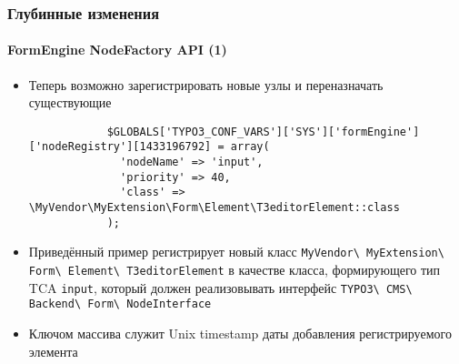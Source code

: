 \begin{frame}[fragile]
	\frametitle{Глубинные изменения}
	\framesubtitle{FormEngine NodeFactory API (1)}

	\lstset{basicstyle=\tiny\ttfamily}

	\begin{itemize}

		\item Теперь возможно зарегистрировать новые узлы и переназначать существующие

		\begin{lstlisting}
			$GLOBALS['TYPO3_CONF_VARS']['SYS']['formEngine']['nodeRegistry'][1433196792] = array(
			  'nodeName' => 'input',
			  'priority' => 40,
			  'class' => \MyVendor\MyExtension\Form\Element\T3editorElement::class
			);
		\end{lstlisting}

		\item Приведённый пример регистрирует новый класс
			\texttt{MyVendor\textbackslash
				MyExtension\textbackslash
				Form\textbackslash
				Element\textbackslash
				T3editorElement}
			в качестве класса, формирующего тип TCA \texttt{input}, который должен реализовывать интерфейс
			\texttt{TYPO3\textbackslash
				CMS\textbackslash
				Backend\textbackslash
				Form\textbackslash
				NodeInterface}

		\item Ключом массива служит Unix timestamp даты добавления регистрируемого элемента

	\end{itemize}

\end{frame}


